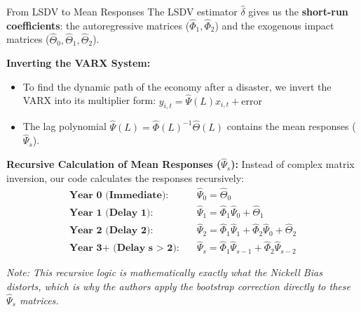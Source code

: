 \documentclass[10pt, aspectratio=169]{beamer}
\begin{document}
\begin{frame}{From LSDV to Mean Responses}
    The LSDV estimator $\hat{\delta}$ gives us the \textbf{short-run coefficients}: the autoregressive matrices ($\hat{\Phi}_1, \hat{\Phi}_2$) and the exogenous impact matrices ($\hat{\Theta}_0, \hat{\Theta}_1, \hat{\Theta}_2$).
    
    \vspace{0.3em}
    \textbf{Inverting the VARX System:}
    \begin{itemize}
        \item To find the dynamic path of the economy after a disaster, we invert the VARX into its multiplier form: $y_{i,t} = \hat{\Psi}(L)x_{i,t} + \text{error}$
        \item The lag polynomial $\hat{\Psi}(L) = \hat{\Phi}(L)^{-1}\hat{\Theta}(L)$ contains the mean responses ($\hat{\Psi}_s$).
    \end{itemize}

    \vspace{0.3em}
    \textbf{Recursive Calculation of Mean Responses ($\hat{\Psi}_s$):}
    Instead of complex matrix inversion, our code calculates the responses recursively:
    \begin{align*}
        \textbf{Year 0 (Immediate):} \quad & \hat{\Psi}_0 = \hat{\Theta}_0 \\
        \textbf{Year 1 (Delay 1):} \quad & \hat{\Psi}_1 = \hat{\Phi}_1\hat{\Psi}_0 + \hat{\Theta}_1 \\
        \textbf{Year 2 (Delay 2):} \quad & \hat{\Psi}_2 = \hat{\Phi}_1\hat{\Psi}_1 + \hat{\Phi}_2\hat{\Psi}_0 + \hat{\Theta}_2 \\
        \textbf{Year 3+ (Delay s > 2):} \quad & \hat{\Psi}_s = \hat{\Phi}_1\hat{\Psi}_{s-1} + \hat{\Phi}_2\hat{\Psi}_{s-2}
    \end{align*}
    
    \footnotesize \textit{Note: This recursive logic is mathematically exactly what the Nickell Bias distorts, which is why the authors apply the bootstrap correction directly to these $\hat{\Psi}_s$ matrices.}
\end{frame}
\end{document}
